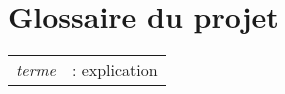 \section*{Glossaire du projet}
    \begin{tabular}{>{\itshape}l >{ : }l}
		terme & explication
    \end{tabular}
